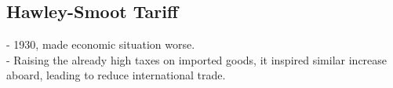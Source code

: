 \documentclass{article}
\begin{document}
\subsection{ Hawley-Smoot Tariff}
- 1930, made economic situation worse.\\
- Raising the already high taxes on imported goods, it inspired similar increase aboard, leading to reduce international trade.\\
\end{document}
